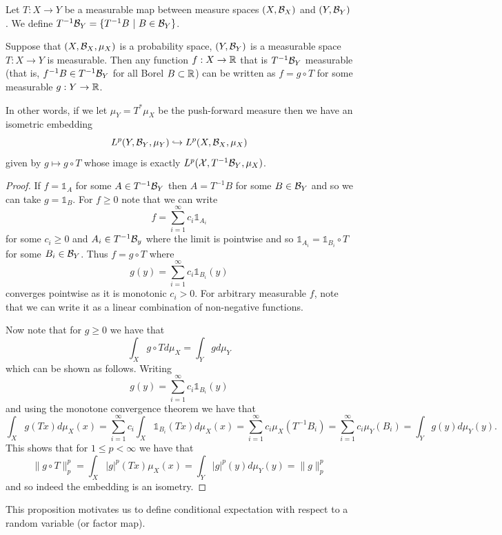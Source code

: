 \documentclass[twoside, a4paper, 10pt]{amsart}
\begin{document}
\begin{mydef} Let $T:X \to Y$ be a measurable map between measure spaces $(X,\mathcal{B}_X)$ and $(Y,\mathcal{B}_Y)$. We define $T^{-1}\mathcal{B}_Y = \{ T^{-1}B ~|~ B \in \mathcal{B}_Y\}$.

\end{mydef}

\begin{prop} \label{prop: measurable implies factorable} Suppose that $(X,\mathcal{B}_X, \mu_X)$ is a probability space, $(Y,\mathcal{B}_Y)$ is a measurable space $T:X \to Y$ is measurable. Then any function $f:X \to \mathbb{R}$ that is $T^{-1}\mathcal{B}_Y$ measurable (that is, $f^{-1}B \in T^{-1}\mathcal{B}_Y$ for all Borel $B \subset \mathbb{R}$) can be written as $f = g \circ T$ for some measurable $g:Y \to \mathbb{R}$. 

In other words, if we let $\mu_Y = T^* \mu_X$ be the push-forward measure then we have an isometric embedding $$L^p(Y, \mathcal{B}_Y, \mu_Y) \hookrightarrow L^p(X,\mathcal{B}_X, \mu_X)$$ given by $g \mapsto g \circ T$ whose image is exactly $L^p(\mathcal{X}, T^{-1}\mathcal{B}_Y, \mu_X)$.
\end{prop}

\begin{proof} If $f = \mathds{1}_A$ for some $A \in T^{-1}\mathcal{B}_Y$ then $A = T^{-1}B$ for some $B \in \mathcal{B}_Y$ and so we can take $g = \mathds{1}_B$. For $f \geq 0$ note that we can write $$f = \sum_{i=1}^{\infty} c_i \mathds{1}_{A_i}$$ for some $c_i \geq 0$ and $A_i \in T^{-1}\mathcal{B}_y$ where the limit is pointwise and so $\mathds{1}_{A_i} = \mathds{1}_{B_i} \circ T$ for some $B_i \in \mathcal{B}_Y$. Thus $f = g \circ T$ where $$g(y) = \sum_{i=1}^{\infty} c_i \mathds{1}_{B_i}(y)$$ converges pointwise as it is monotonic $c_i >0 $. For arbitrary measurable $f$, note that we can write it as a linear combination of non-negative functions. 

Now note that for $g \geq 0$ we have that $$\int_X g \circ T d\mu_X = \int_Y g d \mu_Y$$ which can be shown as follows. Writing $$g(y) = \sum_{i=1}^{\infty} c_i \mathds{1}_{B_i}(y)$$ and using the monotone convergence theorem we have that $$\int_X g(Tx) d\mu_X (x) = \sum_{i=1}^{\infty} c_i \int_X \mathds{1}_{B_i}(Tx) d\mu_X(x) = \sum_{i=1}^{\infty}c_i \mu_X(T^{-1}B_i) = \sum_{i=1}^{\infty}c_i \mu_Y(B_i) = \int_{Y} g(y) d\mu_Y(y) .$$ This shows that for $1 \leq p < \infty$ we have that $$\|g \circ T\|_p^p = \int_X |g|^p(Tx) \mu_X(x) = \int_Y |g|^p(y) d\mu_Y(y) = \|g\|_p^p$$ and so indeed the embedding is an isometry. \end{proof}

This proposition motivates us to define conditional expectation with respect to a random variable (or factor map). 
\end{document}
